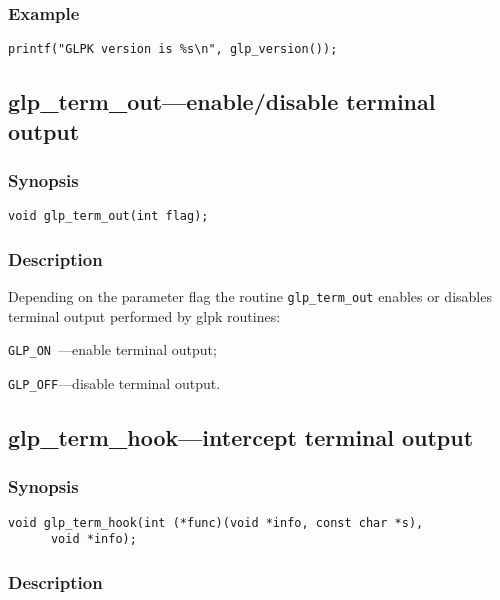 \subsubsection*{Example}

\begin{verbatim}
printf("GLPK version is %s\n", glp_version());
\end{verbatim}

\subsection{glp\_term\_out---enable/disable terminal output}

\subsubsection*{Synopsis}

\begin{verbatim}
void glp_term_out(int flag);
\end{verbatim}

\subsubsection*{Description}

Depending on the parameter flag the routine \verb|glp_term_out| enables
or disables terminal output performed by glpk routines:

\verb|GLP_ON |---enable terminal output;

\verb|GLP_OFF|---disable terminal output.

\subsection{glp\_term\_hook---intercept terminal output}

\subsubsection*{Synopsis}

\begin{verbatim}
void glp_term_hook(int (*func)(void *info, const char *s),
      void *info);
\end{verbatim}

\subsubsection*{Description}

